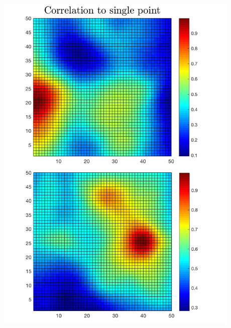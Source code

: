\documentclass{beamer}
\begin{document}
\begin{frame}
\begin{columns}
\begin{column}{0.5\textwidth}
\begin{center}
     \includegraphics[width=0.88\textwidth]{Images/modCorrelation2.png} 
     \end{center}
\end{column}
\end{columns}
\end{frame}
\end{document}
